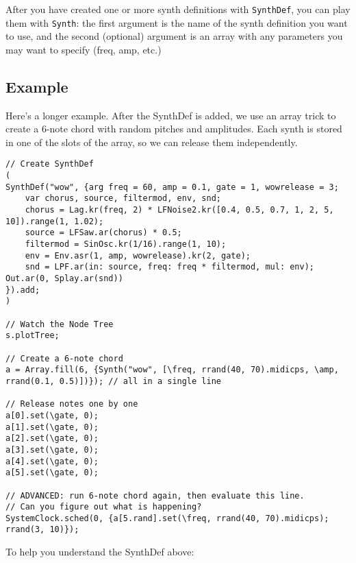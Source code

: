 After you have created one or more synth definitions with \texttt{SynthDef}, you can play them with \texttt{Synth}: the first argument is the name of the synth definition you want to use, and the second (optional) argument is an array with any parameters you may want to specify (freq, amp, etc.)

\subsection{Example}

Here's a longer example. After the SynthDef is added, we use an array trick to create a 6-note chord with random pitches and amplitudes. Each synth is stored in one of the slots of the array, so we can release them independently.

 
\begin{lstlisting}[style=SuperCollider-IDE, basicstyle=\scttfamily\footnotesize]
// Create SynthDef
(
SynthDef("wow", {arg freq = 60, amp = 0.1, gate = 1, wowrelease = 3;
	var chorus, source, filtermod, env, snd;
	chorus = Lag.kr(freq, 2) * LFNoise2.kr([0.4, 0.5, 0.7, 1, 2, 5, 10]).range(1, 1.02);
	source = LFSaw.ar(chorus) * 0.5;
	filtermod = SinOsc.kr(1/16).range(1, 10);
	env = Env.asr(1, amp, wowrelease).kr(2, gate);
	snd = LPF.ar(in: source, freq: freq * filtermod, mul: env);
Out.ar(0, Splay.ar(snd))
}).add;
)

// Watch the Node Tree
s.plotTree;

// Create a 6-note chord
a = Array.fill(6, {Synth("wow", [\freq, rrand(40, 70).midicps, \amp, rrand(0.1, 0.5)])}); // all in a single line

// Release notes one by one
a[0].set(\gate, 0);
a[1].set(\gate, 0);
a[2].set(\gate, 0);
a[3].set(\gate, 0);
a[4].set(\gate, 0);
a[5].set(\gate, 0);

// ADVANCED: run 6-note chord again, then evaluate this line.
// Can you figure out what is happening?
SystemClock.sched(0, {a[5.rand].set(\freq, rrand(40, 70).midicps); rrand(3, 10)});
\end{lstlisting}

To help you understand the SynthDef above:


